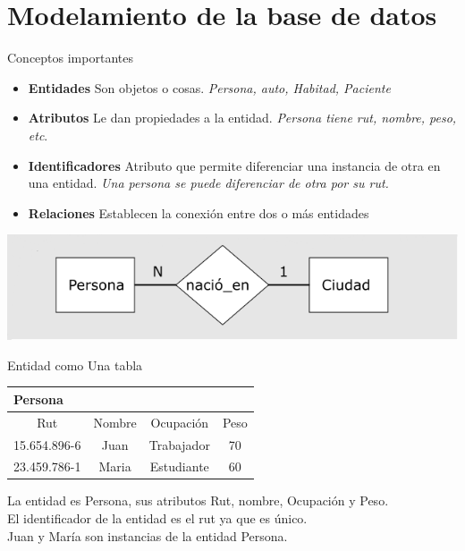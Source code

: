 \documentclass[11pt]{beamer}
\begin{document}
\section{Modelamiento de la base de datos}




\begin{frame}{Conceptos importantes }
\begin{itemize}

\item \textbf{Entidades} Son objetos o cosas. \textit{Persona, auto, Habitad, Paciente}

\item \textbf{Atributos} Le dan propiedades a la entidad. \textit{Persona tiene rut, nombre, peso, etc}.

\item \textbf{Identificadores} Atributo que permite diferenciar una instancia de otra en una entidad. \textit{Una persona se puede diferenciar de otra por su rut.}

\item  \textbf{Relaciones} Establecen la conexión entre dos o más entidades

\end{itemize}


\begin{center}
\includegraphics[scale=0.5]{images/rel.png} 
\end{center}


\end{frame}


\begin{frame}{Entidad como Una tabla}
\begin{table}[!H]
\begin{tabular}{|c|c|c|c|}
\hline
\multicolumn{4}{|l|}{Persona} \\ \hline
\hline 
Rut & Nombre & Ocupación & Peso \\ 
\hline 
15.654.896-6 & Juan & Trabajador & 70 \\ 
\hline 
23.459.786-1 & Maria & Estudiante & 60 \\ 
\hline 
\end{tabular} 
\end{table}

La entidad es Persona, sus atributos Rut, nombre, Ocupación y Peso.\\
El identificador de la entidad es el rut ya que es único.\\
Juan y María son instancias de la entidad Persona.\\

\end{frame}
\end{document}
